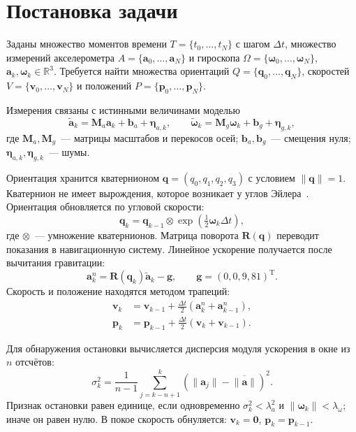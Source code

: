 \documentclass{misisarticle}
\begin{document}
\section{Постановка задачи}

Заданы множество моментов времени $T=\{t_0,\dots,t_N\}$ с шагом $\Delta t$, множество измерений акселерометра $A=\{\mathbf a_0,\dots,\mathbf a_N\}$ и гироскопа $\Omega=\{\boldsymbol\omega_0,\dots,\boldsymbol\omega_N\}$, $\mathbf a_k,\boldsymbol\omega_k\in\mathbb R^3$. Требуется найти множества ориентаций $Q=\{\mathbf q_0,\dots,\mathbf q_N\}$, скоростей $V=\{\mathbf v_0,\dots,\mathbf v_N\}$ и положений $P=\{\mathbf p_0,\dots,\mathbf p_N\}$.

Измерения связаны с истинными величинами моделью
\begin{equation}
\tilde{\mathbf a}_k=\mathbf M_a\mathbf a_k+\mathbf b_a+\boldsymbol\eta_{a,k},\qquad
\tilde{\boldsymbol\omega}_k=\mathbf M_g\boldsymbol\omega_k+\mathbf b_g+\boldsymbol\eta_{g,k},
\label{eq:model}
\end{equation}
где $\mathbf M_a,\mathbf M_g$~--- матрицы масштабов и перекосов осей; $\mathbf b_a,\mathbf b_g$~--- смещения нуля; $\boldsymbol\eta_{a,k},\boldsymbol\eta_{g,k}$~--- шумы.

Ориентация хранится кватернионом $\mathbf q=(q_0,q_1,q_2,q_3)$ с условием $\|\mathbf q\|=1$. Кватернион не имеет вырождения, которое возникает у углов Эйлера~\cite{woodman}. Ориентация обновляется по угловой скорости:
\begin{equation}
\mathbf q_k=\mathbf q_{k-1}\otimes\exp\!\left(\tfrac12\boldsymbol\omega_k\Delta t\right),
\label{eq:quat}
\end{equation}
где $\otimes$~--- умножение кватернионов. Матрица поворота $\mathbf R(\mathbf q)$ переводит показания в навигационную систему. Линейное ускорение получается после вычитания гравитации:
\begin{equation}
\mathbf a_k^{n}=\mathbf R(\mathbf q_k)\tilde{\mathbf a}_k-\mathbf g,\qquad \mathbf g=(0,0,9{,}81)^\mathrm T.
\label{eq:lin}
\end{equation}
Скорость и положение находятся методом трапеций:
\begin{align}
\mathbf v_k&=\mathbf v_{k-1}+\tfrac{\Delta t}{2}\left(\mathbf a_k^{n}+\mathbf a_{k-1}^{n}\right),
\label{eq:v}\\
\mathbf p_k&=\mathbf p_{k-1}+\tfrac{\Delta t}{2}\left(\mathbf v_k+\mathbf v_{k-1}\right).
\label{eq:p}
\end{align}

Для обнаружения остановки вычисляется дисперсия модуля ускорения в окне из $n$ отсчётов:
\begin{equation}
\sigma_k^2=\frac{1}{n-1}\sum_{j=k-n+1}^{k}\left(\|\mathbf a_j\|-\overline{\|\mathbf a\|}\right)^2.
\label{eq:var}
\end{equation}
Признак остановки равен единице, если одновременно $\sigma_k^2<\lambda_a^2$ и $\|\boldsymbol\omega_k\|<\lambda_\omega$; иначе он равен нулю. В покое скорость обнуляется: $\mathbf v_k=\mathbf 0$, $\mathbf p_k=\mathbf p_{k-1}$.
\end{document}
